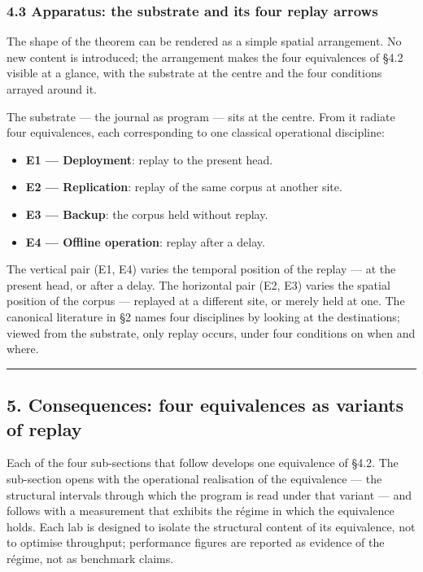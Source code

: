 \documentclass[
]{article}
\providecommand{\tightlist}{%
  \setlength{\itemsep}{0pt}\setlength{\parskip}{0pt}}
\begin{document}
\subsubsection{4.3 Apparatus: the substrate and its four replay
arrows}\label{apparatus-the-substrate-and-its-four-replay-arrows}

The shape of the theorem can be rendered as a simple spatial
arrangement. No new content is introduced; the arrangement makes the
four equivalences of §4.2 visible at a glance, with the substrate at the
centre and the four conditions arrayed around it.

The substrate --- the journal as program --- sits at the centre. From it
radiate four equivalences, each corresponding to one classical
operational discipline:

\begin{itemize}
\tightlist
\item
  \textbf{E1 --- Deployment}: replay to the present head.
\item
  \textbf{E2 --- Replication}: replay of the same corpus at another
  site.
\item
  \textbf{E3 --- Backup}: the corpus held without replay.
\item
  \textbf{E4 --- Offline operation}: replay after a delay.
\end{itemize}

The vertical pair (E1, E4) varies the temporal position of the replay
--- at the present head, or after a delay. The horizontal pair (E2, E3)
varies the spatial position of the corpus --- replayed at a different
site, or merely held at one. The canonical literature in §2 names four
disciplines by looking at the destinations; viewed from the substrate,
only replay occurs, under four conditions on when and where.

\begin{center}\rule{0.5\linewidth}{0.5pt}\end{center}

\subsection{5. Consequences: four equivalences as variants of
replay}\label{consequences-four-equivalences-as-variants-of-replay}

Each of the four sub-sections that follow develops one equivalence of
§4.2. The sub-section opens with the operational realisation of the
equivalence --- the structural intervals through which the program is
read under that variant --- and follows with a measurement that exhibits
the régime in which the equivalence holds. Each lab is designed to
isolate the structural content of its equivalence, not to optimise
throughput; performance figures are reported as evidence of the régime,
not as benchmark claims.
\end{document}
